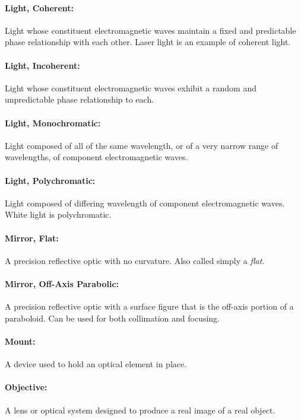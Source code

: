 \documentclass[11pt]{article}
\begin{document}
\paragraph{Light, Coherent:}
Light whose constituent electromagnetic waves maintain a fixed and predictable phase relationship with each other. Laser light is an example of coherent light.
\vspace{-10pt}
\paragraph{Light, Incoherent:} Light whose constituent electromagnetic waves exhibit a random and unpredictable phase relationship to each. 
\vspace{-10pt}
\paragraph{Light, Monochromatic:}
Light composed of all of the same wavelength, or of a very narrow range of wavelengths, of component electromagnetic waves.
\vspace{-10pt}
\paragraph{Light, Polychromatic:}
Light composed of differing wavelength of component electromagnetic waves. White light is polychromatic.
\vspace{-10pt}
\paragraph{Mirror, Flat:}
A precision reflective optic with no curvature. Also called simply a \textit{flat}.
\vspace{-10pt}
\paragraph{Mirror, Off-Axis Parabolic:}
A precision reflective optic with a surface figure that is the off-axis portion of a paraboloid. Can be used for both collimation and focusing.
\vspace{-10pt}
\paragraph{Mount:}
A device used to hold an optical element in place.
\vspace{-10pt}
\paragraph{Objective:} A lens or optical system designed to produce a real image of a real object.
\vspace{-10pt}
\end{document}
